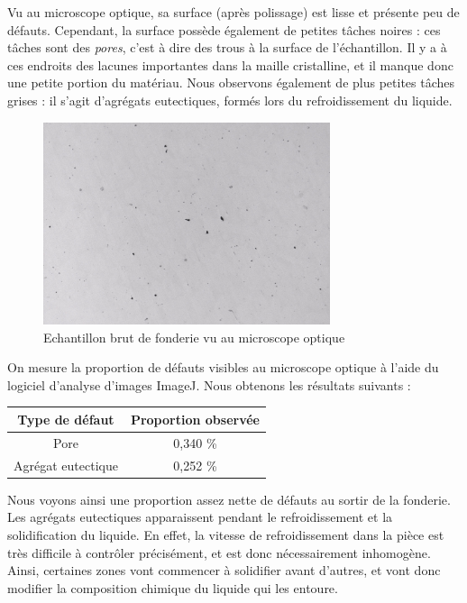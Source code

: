 Vu au microscope optique, sa surface (après polissage) est lisse
et présente peu de défauts. Cependant, la surface possède 
également de petites tâches noires : ces tâches sont des \emph{pores},
c'est à dire des trous à la surface de l'échantillon. Il y a à ces endroits 
des lacunes importantes dans la maille cristalline, et il manque donc 
une petite portion du matériau. Nous observons également de plus 
petites tâches grises : il s'agit d'agrégats eutectiques, formés lors du refroidissement du liquide.



\begin{figure}[htbp]
    \centering
    \includegraphics[width=0.75\textwidth]{images_optique/brut2.pdf}
    \caption{Echantillon brut de fonderie vu au microscope optique}
    \label{<label>}
\end{figure}

On mesure la proportion de défauts visibles au microscope optique à l'aide du 
logiciel d'analyse d'images ImageJ. Nous obtenons les résultats suivants : \\
\begin{center}
    \begin{tabular}{c|c}
        \textbf{Type de défaut}  & \textbf{Proportion observée}  \\
        \hline
        Pore               & 0,340 \% \\
        Agrégat eutectique & 0,252 \% \\
    \end{tabular}
    \caption{Proportion des différents défauts dans l'échantillon brut de fonderie}
\end{center}

Nous voyons ainsi une proportion assez nette de défauts au sortir de la fonderie. 
Les agrégats eutectiques apparaissent pendant le refroidissement 
et la solidification du liquide. En effet, la vitesse de refroidissement dans 
la pièce est très difficile à contrôler précisément, et est donc nécessairement
inhomogène. Ainsi, certaines zones vont commencer à solidifier avant d'autres, et 
vont donc modifier la composition chimique du liquide qui les entoure. 

